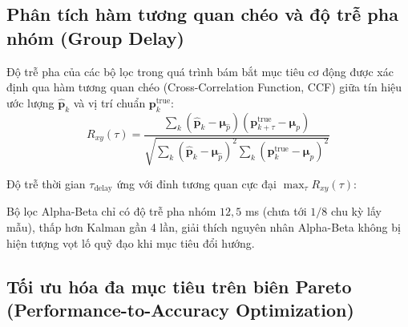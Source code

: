 \subsection{Phân tích hàm tương quan chéo và độ trễ pha nhóm (Group Delay)}

\hspace{0.5cm} Độ trễ pha của các bộ lọc trong quá trình bám bắt mục tiêu cơ động được xác định qua hàm tương quan chéo (Cross-Correlation Function, CCF) giữa tín hiệu ước lượng $\hat{\mathbf{p}}_k$ và vị trí chuẩn $\mathbf{p}_k^{\text{true}}$:
\begin{equation}
R_{xy}(\tau) = \frac{\sum_{k} (\hat{\mathbf{p}}_k - \boldsymbol{\mu}_{\hat{p}})(\mathbf{p}_{k+\tau}^{\text{true}} - \boldsymbol{\mu}_{p})}{\sqrt{\sum_k (\hat{\mathbf{p}}_k - \boldsymbol{\mu}_{\hat{p}})^2 \sum_k (\mathbf{p}_k^{\text{true}} - \boldsymbol{\mu}_{p})^2}}
\label{eq:cross-correlation-formula}
\end{equation}

Độ trễ thời gian $\tau_{\text{delay}}$ ứng với đỉnh tương quan cực đại $\max_\tau R_{xy}(\tau)$:

\begin{table}[H]
\centering
\caption{Độ trễ pha nhóm và hệ số tương quan cực đại của các giải thuật lọc}
\label{tab:cross-correlation-delay-results}
\end{table}

Bộ lọc Alpha-Beta chỉ có độ trễ pha nhóm $12{,}5$ ms (chưa tới $1/8$ chu kỳ lấy mẫu), thấp hơn Kalman gần 4 lần, giải thích nguyên nhân Alpha-Beta không bị hiện tượng vọt lố quỹ đạo khi mục tiêu đổi hướng.

\subsection{Tối ưu hóa đa mục tiêu trên biên Pareto (Performance-to-Accuracy Optimization)}

